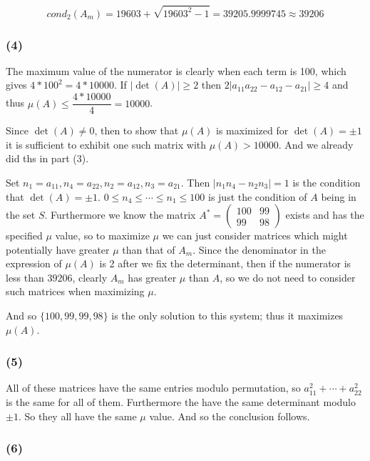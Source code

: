 \documentclass{article}
\begin{document}
\[ cond_2(A_m) = 19603 + \sqrt{19603^2 - 1} = 39205.9999745 \approx 39206 \]

\subsubsection{(4)}

The maximum value of the numerator is clearly when each term is 100, which gives $4 * 100^2 = 4 * 10000$. If $|\det(A)| \ge 2$ then $2|a_{11} a_{22} - a_{12} - a_{21}| \ge 4$ and thus $\mu(A) \le \dfrac{4 * 10000}{4} = 10000$. 

Since $\det(A) \neq 0$, then to show that $\mu(A)$ is maximized for $\det(A) = \pm 1$ it is sufficient to exhibit one such matrix with $\mu(A) > 10000$. And we already did ths in part (3). 

Set $n_1 = a_{11}, n_4 = a_{22}, n_2 = a_{12}, n_3 = a_{21}$. Then $|n_1 n_4 - n_2 n_3| = 1$ is the condition that $\det(A) = \pm 1$. $0 \le n_4 \le \cdots \le n_1 \le 100$ is just the condition of $A$ being in the set $S$. Furthermore we know the matrix $A^* = \left(\begin{array}{cc} 100 & 99 \\ 99 & 98 \end{array}\right)$ exists and has the specified $\mu$ value, so to maximize $\mu$ we can just consider matrices which might potentially have greater $\mu$ than that of $A_m$. Since the denominator in the expression of $\mu(A)$ is 2 after we fix the determinant, then if the numerator is less than $39206$, clearly $A_m$ has greater $\mu$ than $A$, so we do not need to consider such matrices when maximizing $\mu$. 

And so $\{100,99,99,98\}$ is the only solution to this system; thus it maximizes $\mu(A)$. 

\subsubsection{(5)} 

All of these matrices have the same entries modulo permutation, so $a_{11}^2 + \cdots + a_{22}^2$ is the same for all of them. Furthermore the have the same determinant modulo $\pm 1$. So they all have the same $\mu$ value. And so the conclusion follows. 

\subsubsection{(6)} 
\end{document}
